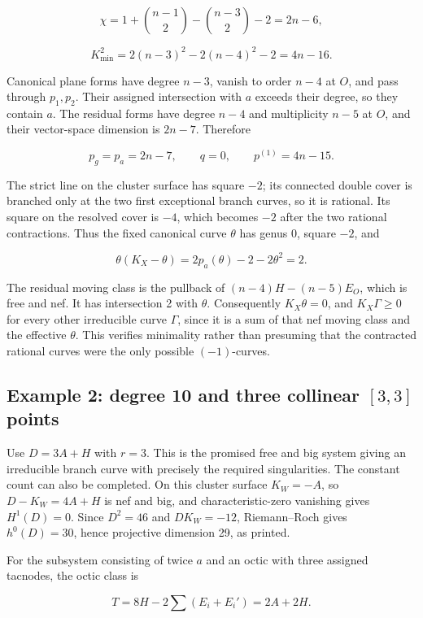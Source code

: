 \[
\chi=1+\binom{n-1}{2}-\binom{n-3}{2}-2=2n-6,
\]

\[
K_{\min}^2=2(n-3)^2-2(n-4)^2-2=4n-16.
\]

Canonical plane forms have degree \(n-3\), vanish to order \(n-4\) at \(O\), and pass through \(p_1,p_2\). Their assigned intersection with \(a\) exceeds their degree, so they contain \(a\). The residual forms have degree \(n-4\) and multiplicity \(n-5\) at \(O\), and their vector-space dimension is \(2n-7\). Therefore

\[
p_g=p_a=2n-7,\qquad q=0,\qquad p^{(1)}=4n-15.
\]

The strict line on the cluster surface has square \(-2\); its connected double cover is branched only at the two first exceptional branch curves, so it is rational. Its square on the resolved cover is \(-4\), which becomes \(-2\) after the two rational contractions. Thus the fixed canonical curve \(\theta\) has genus 0, square \(-2\), and

\[
\theta(K_X-\theta)=2p_a(\theta)-2-2\theta^2=2.
\]

The residual moving class is the pullback of \((n-4)H-(n-5)E_O\), which is free and nef. It has intersection 2 with \(\theta\). Consequently \(K_X\theta=0\), and \(K_X\Gamma\ge 0\) for every other irreducible curve \(\Gamma\), since it is a sum of that nef moving class and the effective \(\theta\). This verifies minimality rather than presuming that the contracted rational curves were the only possible \((-1)\)-curves.

\subsection{\texorpdfstring{Example 2: degree 10 and three collinear \([3,3]\) points}{Example 2: degree 10 and three collinear {[}3,3{]} points}}

Use \(D=3 A+H\) with \(r=3\). This is the promised free and big system giving an irreducible branch curve with precisely the required singularities. The constant count can also be completed. On this cluster surface \(K_W=-A\), so \(D-K_W=4 A+H\) is nef and big, and characteristic-zero vanishing gives \(H^1(D)=0\). Since \(D^2=46\) and \(DK_W=-12\), Riemann--Roch gives \(h^0(D)=30\), hence projective dimension 29, as printed.

For the subsystem consisting of twice \(a\) and an octic with three assigned tacnodes, the octic class is

\[
T=8H-2\sum(E_i+E_i')=2A+2H.
\]

